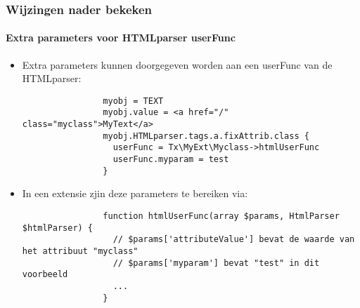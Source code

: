 \begin{frame}[fragile]
	\frametitle{Wijzingen nader bekeken}
	\framesubtitle{Extra parameters voor HTMLparser userFunc}

	\lstset{basicstyle=\tiny\ttfamily}

	\begin{itemize}

		\item Extra parameters kunnen doorgegeven worden aan een userFunc van de HTMLparser:

			\begin{lstlisting}
				myobj = TEXT
				myobj.value = <a href="/" class="myclass">MyText</a>
				myobj.HTMLparser.tags.a.fixAttrib.class {
				  userFunc = Tx\MyExt\Myclass->htmlUserFunc
				  userFunc.myparam = test
				}
			\end{lstlisting}

		\item In een extensie zjin deze parameters te bereiken via:

			\begin{lstlisting}
				function htmlUserFunc(array $params, HtmlParser $htmlParser) {
				  // $params['attributeValue'] bevat de waarde van het attribuut "myclass"
				  // $params['myparam'] bevat "test" in dit voorbeeld
				  ...
				}
			\end{lstlisting}

	\end{itemize}

\end{frame}

